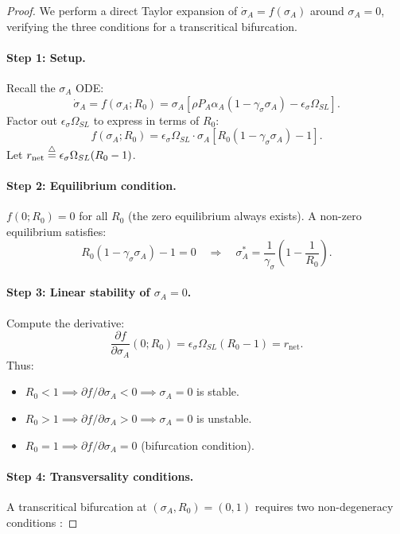 \begin{proof}
We perform a direct Taylor expansion of $\dot{\sigma}_A = f(\sigma_A)$
around $\sigma_A = 0$, verifying the three conditions for a
transcritical bifurcation.

\paragraph{Step 1: Setup.}
Recall the $\sigma_A$ ODE:
\[
\dot{\sigma}_A = f(\sigma_A; R_0) = \sigma_A \left[ \rho P_A \alpha_A (1 - \gamma_\sigma \sigma_A) - \epsilon_\sigma \Omega_{SL} \right].
\]
Factor out $\epsilon_\sigma \Omega_{SL}$ to express in terms of $R_0$:
\[
f(\sigma_A; R_0) = \epsilon_\sigma \Omega_{SL} \cdot \sigma_A \left[ R_0 (1 - \gamma_\sigma \sigma_A) - 1 \right].
\]
Let $r_{\text{net}} \stackrel{\triangle}{=} \epsilon_\sigma \Omega_{SL} (R_0 - 1)$.

\paragraph{Step 2: Equilibrium condition.}
$f(0; R_0) = 0$ for all $R_0$ (the zero equilibrium always exists).
A non-zero equilibrium satisfies:
\[
R_0 (1 - \gamma_\sigma \sigma_A) - 1 = 0 \quad\Longrightarrow\quad
\sigma_A^* = \frac{1}{\gamma_\sigma}\left(1 - \frac{1}{R_0}\right).
\]

\paragraph{Step 3: Linear stability of $\sigma_A = 0$.}
Compute the derivative:
\[
\frac{\partial f}{\partial \sigma_A}(0; R_0) = \epsilon_\sigma \Omega_{SL} (R_0 - 1) = r_{\text{net}}.
\]
Thus:
\begin{itemize}[nosep]
\item $R_0 < 1 \implies \partial f/\partial \sigma_A < 0 \implies \sigma_A = 0$ is stable.
\item $R_0 > 1 \implies \partial f/\partial \sigma_A > 0 \implies \sigma_A = 0$ is unstable.
\item $R_0 = 1 \implies \partial f/\partial \sigma_A = 0$ (bifurcation condition).
\end{itemize}

\paragraph{Step 4: Transversality conditions.}
A transcritical bifurcation at $(\sigma_A, R_0) = (0, 1)$ requires
two non-degeneracy conditions \citep[Thm.~3.2]{kuznetsov1998}:


\end{proof}
